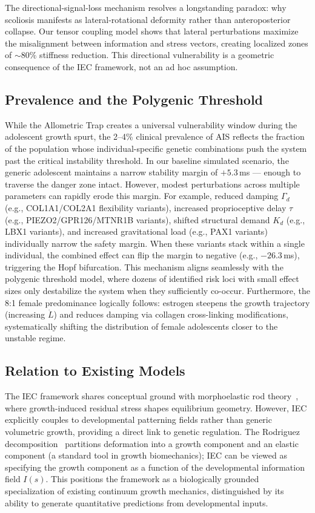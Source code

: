 The directional-signal-loss mechanism resolves a longstanding paradox: why scoliosis manifests as lateral-rotational deformity rather than anteroposterior collapse. Our tensor coupling model shows that lateral perturbations maximize the misalignment between information and stress vectors, creating localized zones of ${\sim}80\%$ stiffness reduction. This directional vulnerability is a geometric consequence of the IEC framework, not an ad hoc assumption.

\subsection{Prevalence and the Polygenic Threshold}

While the Allometric Trap creates a universal vulnerability window during the adolescent growth spurt, the 2--4\% clinical prevalence of AIS reflects the fraction of the population whose individual-specific genetic combinations push the system past the critical instability threshold. In our baseline simulated scenario, the generic adolescent maintains a narrow stability margin of $+5.3$\,ms --- enough to traverse the danger zone intact. However, modest perturbations across multiple parameters can rapidly erode this margin. For example, reduced damping $\Gamma_d$ (e.g., COL1A1/COL2A1 flexibility variants), increased proprioceptive delay $\tau$ (e.g., PIEZO2/GPR126/MTNR1B variants), shifted structural demand $K_d$ (e.g., LBX1 variants), and increased gravitational load (e.g., PAX1 variants) individually narrow the safety margin. When these variants stack within a single individual, the combined effect can flip the margin to negative (e.g., $-26.3$\,ms), triggering the Hopf bifurcation. This mechanism aligns seamlessly with the polygenic threshold model, where dozens of identified risk loci with small effect sizes only destabilize the system when they sufficiently co-occur. Furthermore, the 8:1 female predominance logically follows: estrogen steepens the growth trajectory (increasing $\dot{L}$) and reduces damping via collagen cross-linking modifications, systematically shifting the distribution of female adolescents closer to the unstable regime.

\subsection{Relation to Existing Models}

The IEC framework shares conceptual ground with morphoelastic rod theory~\cite{moulton2013morphoelastic}, where growth-induced residual stress shapes equilibrium geometry. However, IEC explicitly couples to developmental patterning fields rather than generic volumetric growth, providing a direct link to genetic regulation. The Rodriguez decomposition~\cite{rodriguez1994stress} partitions deformation into a growth component and an elastic component (a standard tool in growth biomechanics); IEC can be viewed as specifying the growth component as a function of the developmental information field $I(s)$. This positions the framework as a biologically grounded specialization of existing continuum growth mechanics, distinguished by its ability to generate quantitative predictions from developmental inputs.

